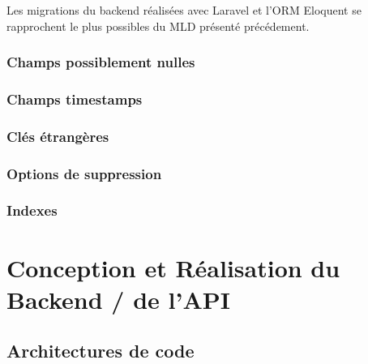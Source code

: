 \documentclass[
    iai, %
    il, %
]{heig-tb}
\begin{document}
Les migrations du backend réalisées avec Laravel et l'ORM Eloquent se rapprochent le plus possibles du MLD présenté précédement.


\subsection{Champs possiblement nulles}

\subsection{Champs timestamps}

\subsection{Clés étrangères}

\subsection{Options de suppression}

\subsection{Indexes}

\chapter{Conception et Réalisation du Backend / de l'API}
\section{Architectures de code}





\end{document}
